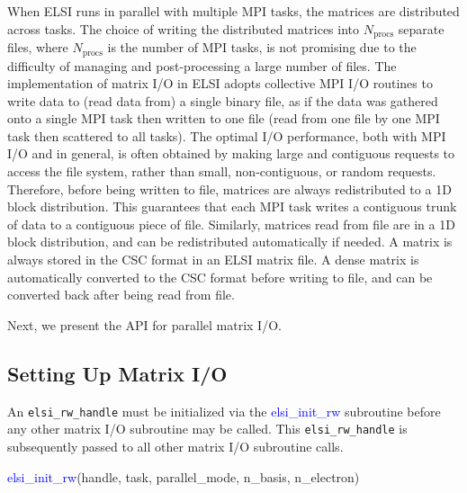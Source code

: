 \documentclass{report}
\begin{document}
When ELSI runs in parallel with multiple MPI tasks, the matrices are distributed across tasks.  The choice of writing the distributed matrices into $N_\text{procs}$ separate files, where $N_\text{procs}$ is the number of MPI tasks, is not promising due to the difficulty of managing and post-processing a large number of files.  The implementation of matrix I/O in ELSI adopts collective MPI I/O routines to write data to (read data from) a single binary file, as if the data was gathered onto a single MPI task then written to one file (read from one file by one MPI task then scattered to all tasks).  The optimal I/O performance, both with MPI I/O and in general, is often obtained by making large and contiguous requests to access the file system, rather than small, non-contiguous, or random requests.  Therefore, before being written to file, matrices are always redistributed to a 1D block distribution.  This guarantees that each MPI task writes a contiguous trunk of data to a contiguous piece of file.  Similarly, matrices read from file are in a 1D block distribution, and can be redistributed automatically if needed.  A matrix is always stored in the CSC format in an ELSI matrix file.  A dense matrix is automatically converted to the CSC format before writing to file, and can be converted back after being read from file.

Next, we present the API for parallel matrix I/O.

\subsection{Setting Up Matrix I/O}
\label{subsec:rw_init}
An \texttt{elsi\_rw\_handle} must be initialized via the \textcolor{blue}{elsi\_init\_rw} subroutine before any other matrix I/O subroutine may be called.  This \texttt{elsi\_rw\_handle} is subsequently passed to all other matrix I/O subroutine calls.
\begin{labeling}{\hspace{6cm}}
\item [\hspace{0.3cm} \textcolor{blue}{elsi\_init\_rw}(handle, task, parallel\_mode, n\_basis, n\_electron)]
\end{labeling}
\end{document}
